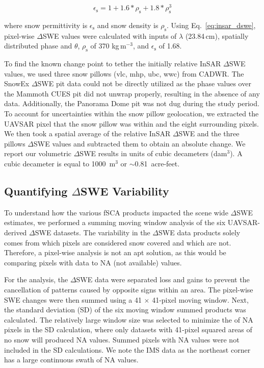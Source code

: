 \begin{equation}
\epsilon_\mathrm{s} = 1 + 1.6 * \rho_\mathrm{s} + 1.8 * \rho_\mathrm{s}^3
\label{eq:dens_to_perm}
\end{equation}


\noindent where snow permittivity is $\epsilon_\mathrm{s}$ and snow density is $\rho_\mathrm{s}$. Using Eq.~\ref{eq:insar_dswe}, pixel-wise $\Delta$SWE values were calculated with inputs of $\lambda$ (23.84\,cm), spatially distributed phase and $\theta$, $\rho_\mathrm{s}$ of 370 kg\,m$^{-3}$, and $\epsilon_\mathrm{s}$ of 1.68. 

To find the known change point to tether the initially relative InSAR $\Delta$SWE values, we used three snow pillows (vlc, mhp, ubc, wwc) from CADWR. The SnowEx $\Delta$SWE pit data could not be directly utilized as the phase values over the Mammoth CUES pit did not unwrap properly, resulting in the absence of any data. Additionally, the Panorama Dome pit was not dug during the study period. To account for uncertainties within the snow pillow geolocation, we extracted the UAVSAR pixel that the snow pillow was within and the eight surrounding pixels. We then took a spatial average of the relative InSAR $\Delta$SWE and the three pillows $\Delta$SWE values and subtracted them to obtain an absolute change. We report our volumetric $\Delta$SWE results in units of cubic decameters (dam$^{3}$). A cubic decameter is equal to 1000~m$^{3}$ or $\sim$0.81~acre-feet.

\hypertarget{ch4-methods-2}{\subsection{Quantifying $\Delta$SWE Variability}\label{ch4-methods-1}}

To understand how the various fSCA products impacted the scene wide $\Delta$SWE estimates, we performed a summing moving window analysis of the six UAVSAR-derived $\Delta$SWE datasets. The variability in the $\Delta$SWE data products solely comes from which pixels are considered snow covered and which are not. Therefore, a pixel-wise analysis is not an apt solution, as this would be comparing pixels with data to  NA (not available) values.

For the analysis, the $\Delta$SWE data were separated loss and gains to prevent the cancellation of patterns caused by opposite signs within an area. The pixel-wise SWE changes were then summed using a 41 $\times$ 41-pixel moving window. Next, the standard deviation (SD) of the six moving window summed products was calculated. The relatively large window size was selected to minimize the of NA pixels in the SD calculation, where only datasets with 41-pixel squared areas of no snow will produced NA values. Summed pixels with NA values were not included in the SD calculations. We note the IMS data as the northeast corner has a large continuous swath of NA values.

